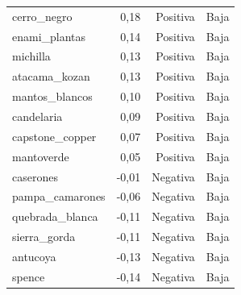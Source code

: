 \begin{longtable}{p{}rrp{}}
cerro\_negro & 0,18 & Positiva & Baja \\
enami\_plantas & 0,14 & Positiva & Baja \\
michilla & 0,13 & Positiva & Baja \\
atacama\_kozan & 0,13 & Positiva & Baja \\
mantos\_blancos & 0,10 & Positiva & Baja \\
candelaria & 0,09 & Positiva & Baja \\
capstone\_copper & 0,07 & Positiva & Baja \\
mantoverde & 0,05 & Positiva & Baja \\
caserones & -0,01 & Negativa & Baja \\
pampa\_camarones & -0,06 & Negativa & Baja \\
quebrada\_blanca & -0,11 & Negativa & Baja \\
sierra\_gorda & -0,11 & Negativa & Baja \\
antucoya & -0,13 & Negativa & Baja \\
spence & -0,14 & Negativa & Baja \\
\bottomrule
\end{longtable}
